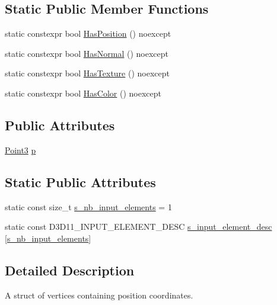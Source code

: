 \subsection*{Static Public Member Functions}
\begin{DoxyCompactItemize}
\item 
static constexpr bool \hyperlink{structmage_1_1_vertex_position_ab99ff01bb689bf62f693f13212d673ad}{Has\+Position} () noexcept
\item 
static constexpr bool \hyperlink{structmage_1_1_vertex_position_ac67b22c20ae993660be823e8e1d9b52d}{Has\+Normal} () noexcept
\item 
static constexpr bool \hyperlink{structmage_1_1_vertex_position_a593c015184b164cf9bcf82938d4db39f}{Has\+Texture} () noexcept
\item 
static constexpr bool \hyperlink{structmage_1_1_vertex_position_a93f07ce2967b0ae2d22dede08b4fd3e0}{Has\+Color} () noexcept
\end{DoxyCompactItemize}
\subsection*{Public Attributes}
\begin{DoxyCompactItemize}
\item 
\hyperlink{structmage_1_1_point3}{Point3} \hyperlink{structmage_1_1_vertex_position_ad9c3ea68e2c1745446387d1eca28f25f}{p}
\end{DoxyCompactItemize}
\subsection*{Static Public Attributes}
\begin{DoxyCompactItemize}
\item 
static const size\+\_\+t \hyperlink{structmage_1_1_vertex_position_aa4a7ef6da8f6bafd32ab180786ee93a0}{s\+\_\+nb\+\_\+input\+\_\+elements} = 1
\item 
static const D3\+D11\+\_\+\+I\+N\+P\+U\+T\+\_\+\+E\+L\+E\+M\+E\+N\+T\+\_\+\+D\+E\+SC \hyperlink{structmage_1_1_vertex_position_a4e43cd06303beccd4791fdec9a13c47f}{s\+\_\+input\+\_\+element\+\_\+desc} \mbox{[}\hyperlink{structmage_1_1_vertex_position_aa4a7ef6da8f6bafd32ab180786ee93a0}{s\+\_\+nb\+\_\+input\+\_\+elements}\mbox{]}
\end{DoxyCompactItemize}


\subsection{Detailed Description}
A struct of vertices containing position coordinates. 

